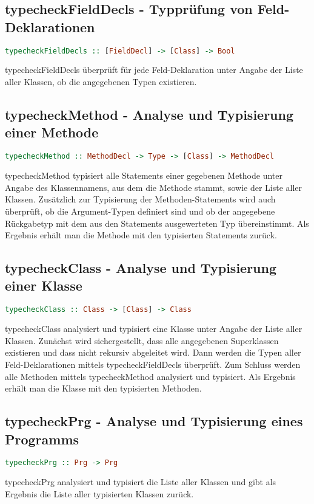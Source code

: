 \documentclass[a4paper,10pt]{article}
\begin{document}
\subsection{typecheckFieldDecls - Typprüfung von Feld-Deklarationen}
\begin{lstlisting}[language=Haskell]
typecheckFieldDecls :: [FieldDecl] -> [Class] -> Bool
\end{lstlisting}
typecheckFieldDecls überprüft für jede Feld-Deklaration unter Angabe der Liste aller Klassen, ob die angegebenen Typen existieren.
\\
\subsection{typecheckMethod - Analyse und Typisierung einer Methode}
\begin{lstlisting}[language=Haskell]
typecheckMethod :: MethodDecl -> Type -> [Class] -> MethodDecl
\end{lstlisting}
typecheckMethod typisiert alle Statements einer gegebenen Methode unter Angabe des Klassennamens, aus dem die Methode stammt, sowie der Liste aller Klassen.
Zusätzlich zur Typisierung der Methoden-Statements wird auch überprüft, ob die Argument-Typen definiert sind und ob der angegebene Rückgabetyp mit dem
aus den Statements ausgewerteten Typ übereinstimmt.
Als Ergebnis erhält man die Methode mit den typisierten Statements zurück.
\\
\subsection{typecheckClass - Analyse und Typisierung einer Klasse}
\begin{lstlisting}[language=Haskell]
typecheckClass :: Class -> [Class] -> Class
\end{lstlisting}
typecheckClass analysiert und typisiert eine Klasse unter Angabe der Liste aller Klassen.
Zunächst wird sichergestellt, dass alle angegebenen Superklassen existieren und dass nicht rekursiv abgeleitet wird.
Dann werden die Typen aller Feld-Deklarationen mittels typecheckFieldDecls überprüft.
Zum Schluss werden alle Methoden mittels typecheckMethod analysiert und typisiert.
Als Ergebnis erhält man die Klasse mit den typisierten Methoden.
\\
\subsection{typecheckPrg - Analyse und Typisierung eines Programms}
\begin{lstlisting}[language=Haskell]
typecheckPrg :: Prg -> Prg
\end{lstlisting}
typecheckPrg analysiert und typisiert die Liste aller Klassen und gibt als Ergebnis die Liste aller typisierten Klassen zurück.
\\
\end{document}
